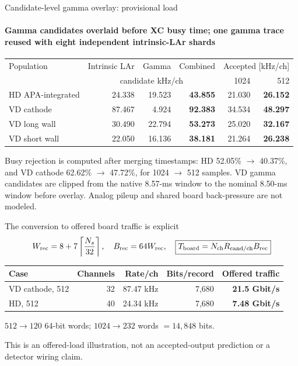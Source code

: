 \documentclass[aspectratio=169,11pt]{beamer}
\begin{document}
\begin{frame}{Candidate-level gamma overlay: provisional load}
  \framesubtitle{Gamma candidates overlaid before XC busy time; one gamma trace reused with eight independent intrinsic-LAr shards}
  \footnotesize
  \setlength{\tabcolsep}{4pt}
  \renewcommand{\arraystretch}{1.13}
  \begin{tabular}{@{}lrrrrr@{}}
    \toprule
    Population & Intrinsic LAr & Gamma & Combined & \multicolumn{2}{c}{Accepted [kHz/ch]} \\
    & \multicolumn{3}{c}{candidate kHz/ch} & 1024 & 512 \\
    \midrule
    HD APA-integrated & 24.338 & 19.523 & \textbf{43.855} & 21.030 & \textbf{26.152} \\
    VD cathode & 87.467 & 4.924 & \textbf{92.383} & 34.534 & \textbf{48.297} \\
    VD long wall & 30.490 & 22.794 & \textbf{53.273} & 25.020 & \textbf{32.167} \\
    VD short wall & 22.050 & 16.136 & \textbf{38.181} & 21.264 & \textbf{26.238} \\
    \bottomrule
  \end{tabular}

  \smallskip
    {Busy rejection is computed after merging timestamps: HD 52.05\% $\rightarrow$ 40.37\%, and VD cathode 62.62\% $\rightarrow$ 47.72\%, for 1024 $\rightarrow$ 512 samples.}
  \smallskip
  {\color{DuneTextMuted}\footnotesize VD gamma candidates are clipped from the native 8.57-ms window to the nominal 8.50-ms window before overlay. Analog pileup and shared board back-pressure are not modeled.}
\end{frame}

\begin{frame}{The conversion to offered board traffic is explicit}
  \small
  \[
    W_{\rm rec}=8+7\left\lceil\frac{N_s}{32}\right\rceil,
    \quad B_{\rm rec}=64W_{\rm rec},
    \quad \boxed{T_{\rm board}=N_{\rm ch}R_{\rm cand/ch}B_{\rm rec}}
  \]

  \centering
  \setlength{\tabcolsep}{5pt}
  \renewcommand{\arraystretch}{1.25}
  \begin{tabular}{@{}lrrrr@{}}
    \toprule
    Case & Channels & Rate/ch & Bits/record & Offered traffic \\
    \midrule
    VD cathode, 512 & 32 & 87.47 kHz & 7,680 & \textbf{21.5 Gbit/s} \\
    HD, 512 & 40 & 24.34 kHz & 7,680 & \textbf{7.48 Gbit/s} \\
    \bottomrule
  \end{tabular}

  \medskip
  \footnotesize
  \(512\rightarrow120\) 64-bit words; \(1024\rightarrow232\) words \(=14{,}848\) bits.

  \medskip
    {This is an offered-load illustration, not an accepted-output prediction or a detector wiring claim.}
\end{frame}
\end{document}
